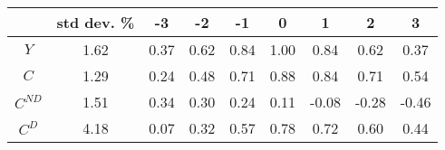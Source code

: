 \begin{tabular}{ccccccccc}
\toprule
 & std dev. \% & -3 & -2 & -1 & 0 & 1 & 2 & 3 \\
\midrule
$Y$ & 1.62 & 0.37 & 0.62 & 0.84 & 1.00 & 0.84 & 0.62 & 0.37 \\
$C$ & 1.29 & 0.24 & 0.48 & 0.71 & 0.88 & 0.84 & 0.71 & 0.54 \\
$C^{ND}$ & 1.51 & 0.34 & 0.30 & 0.24 & 0.11 & -0.08 & -0.28 & -0.46 \\
$C^{D}$ & 4.18 & 0.07 & 0.32 & 0.57 & 0.78 & 0.72 & 0.60 & 0.44 \\
\bottomrule
\end{tabular}
